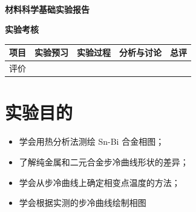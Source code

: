 \documentclass[a4paper,utf8]{article}
\begin{document}
\begin{center}
    {\mbox{}\\[7em]\bfseries\songti%
    材料科学基础实验报告}\\[34mm]
    {\bfseries\songti
    实验考核\\[3mm]
    \extrarowheight=3mm
    \begin{tabularx}{150mm}{|X|X|X|X|X|}\hline
        \hfil 项目 \hfil  & \hfil 实验预习 \hfil & \hfil 实验过程 \hfil & \hfil 分析与讨论 \hfil & \hfil 总评 \hfil \\[3mm] \hline
        \hfil 评价 \hfil &  &  &  &  \\[3mm] \hline
    \end{tabularx}
    }
\end{center}\newpage
\newpage
\section{实验目的}
    \begin{itemize}
        \item 学会用热分析法测绘 Sn-Bi 合金相图；
        \item 了解纯金属和二元合金步冷曲线形状的差异；
        \item 学会从步冷曲线上确定相变点温度的方法；
        \item 学会根据实测的步冷曲线绘制相图
    \end{itemize}
\end{document}
